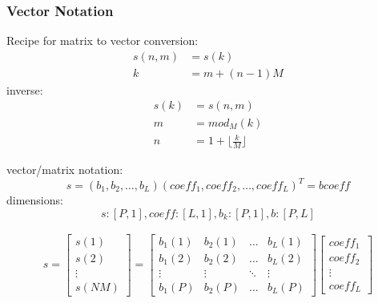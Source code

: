 \documentclass{article}
\begin{document}
\subsubsection{Vector Notation}
Recipe for matrix to vector conversion:
\begin{equation}\begin{split}
    s(n,m) &= s(k) \\ k &= m + (n-1)M
\end{split}\end{equation}
inverse: 
\begin{equation}\begin{split}
    s(k) &= s(n,m)\\
    m &= mod_M(k)\\
    n &= 1 + \lfloor\frac{k}{M}\rfloor
\end{split}
\end{equation}

vector/matrix notation:
\begin{equation}
    s = (b_1, b_2, \dots, b_L)(coeff_1, coeff_2, \dots, coeff_L)^T = b coeff
\end{equation}
dimensions:
\begin{equation}
    s: [P, 1], coeff: [L, 1], b_k: [P, 1], b: [P, L]
\end{equation} 


\begin{equation} \begin{split}
    s = \begin{bmatrix}
    s(1) \\
    s(2) \\
    \vdots \\
    s(NM)
    \end{bmatrix} = \begin{bmatrix}
    b_1(1) & b_2(1) & \dots & b_L(1) \\
    b_1(2) & b_2(2) & \dots & b_L(2) \\
    \vdots & \vdots & \ddots & \vdots \\
    b_1(P) & b_2(P) & \dots & b_L(P)
    \end{bmatrix} \begin{bmatrix}
    coeff_1 \\
    coeff_2 \\
    \vdots \\
    coeff_L
    \end{bmatrix}
\end{split} \end{equation}
\end{document}
